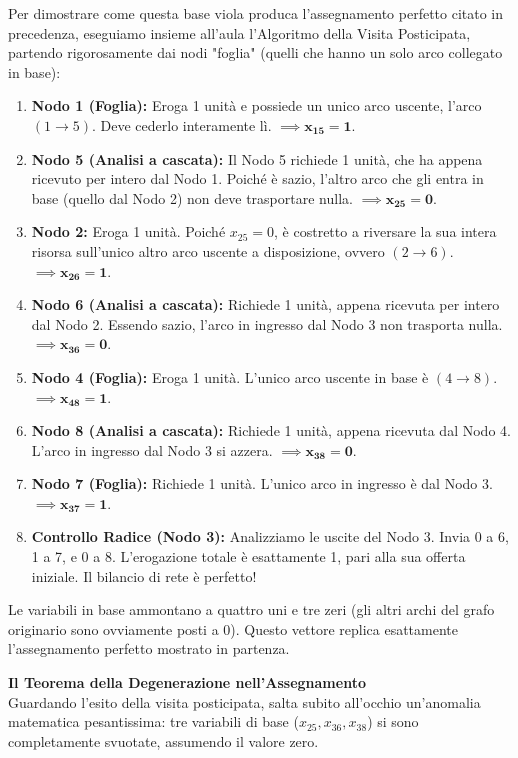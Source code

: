 \documentclass[12pt, a4paper]{article}
\begin{document}
	Per dimostrare come questa base viola produca l'assegnamento perfetto citato in precedenza, eseguiamo insieme all'aula l'Algoritmo della Visita Posticipata, partendo rigorosamente dai nodi "foglia" (quelli che hanno un solo arco collegato in base):
	\begin{enumerate}
		\item \textbf{Nodo 1 (Foglia):} Eroga 1 unità e possiede un unico arco uscente, l'arco $(1\to5)$. Deve cederlo interamente lì. $\implies \mathbf{x_{15} = 1}$.
		\item \textbf{Nodo 5 (Analisi a cascata):} Il Nodo 5 richiede 1 unità, che ha appena ricevuto per intero dal Nodo 1. Poiché è sazio, l'altro arco che gli entra in base (quello dal Nodo 2) non deve trasportare nulla. $\implies \mathbf{x_{25} = 0}$.
		\item \textbf{Nodo 2:} Eroga 1 unità. Poiché $x_{25}=0$, è costretto a riversare la sua intera risorsa sull'unico altro arco uscente a disposizione, ovvero $(2\to6)$. $\implies \mathbf{x_{26} = 1}$.
		\item \textbf{Nodo 6 (Analisi a cascata):} Richiede 1 unità, appena ricevuta per intero dal Nodo 2. Essendo sazio, l'arco in ingresso dal Nodo 3 non trasporta nulla. $\implies \mathbf{x_{36} = 0}$.
		\item \textbf{Nodo 4 (Foglia):} Eroga 1 unità. L'unico arco uscente in base è $(4\to8)$. $\implies \mathbf{x_{48} = 1}$.
		\item \textbf{Nodo 8 (Analisi a cascata):} Richiede 1 unità, appena ricevuta dal Nodo 4. L'arco in ingresso dal Nodo 3 si azzera. $\implies \mathbf{x_{38} = 0}$.
		\item \textbf{Nodo 7 (Foglia):} Richiede 1 unità. L'unico arco in ingresso è dal Nodo 3. $\implies \mathbf{x_{37} = 1}$.
		\item \textbf{Controllo Radice (Nodo 3):} Analizziamo le uscite del Nodo 3. Invia 0 a 6, 1 a 7, e 0 a 8. L'erogazione totale è esattamente 1, pari alla sua offerta iniziale. Il bilancio di rete è perfetto!
	\end{enumerate}
	
	Le variabili in base ammontano a quattro uni e tre zeri (gli altri archi del grafo originario sono ovviamente posti a 0). Questo vettore replica esattamente l'assegnamento perfetto mostrato in partenza.
	
	\vspace{0.4cm}
	\textbf{Il Teorema della Degenerazione nell'Assegnamento}\\
	Guardando l'esito della visita posticipata, salta subito all'occhio un'anomalia matematica pesantissima: tre variabili di base ($x_{25}, x_{36}, x_{38}$) si sono completamente svuotate, assumendo il valore zero.
	
\end{document}
